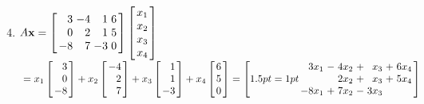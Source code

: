 \begin{multicols}{2}
\begin{ex}
\begin{sol}
\begin{enumerate}[label={\alph*.}]
\setcounter{enumi}{3}
\item
$A\vect{x} = \leftB \begin{array}{rrrr}
3 & -4 & 1 & 6 \\
0 & 2 & 1 & 5 \\
-8 & 7 & -3 & 0
\end{array} \rightB \leftB \begin{array}{r}
x_{1} \\
x_{2} \\
x_{3} \\
x_{4}
\end{array} \rightB$ \\ ${} =
x_{1} \leftB \begin{array}{r}
3 \\
0 \\
-8
\end{array} \rightB + 
x_{2} \leftB \begin{array}{r}
-4 \\
2 \\
7
\end{array} \rightB +
x_{3} \leftB \begin{array}{r}
1 \\
1 \\
-3
\end{array} \rightB +
x_{4} \leftB \begin{array}{r}
6 \\
5 \\
0
\end{array} \rightB = \leftB \arraycolsep=1pt \begin{array}{rrrrrrr}
3x_{1} & - & 4x_{2} & + & x_{3} & + & 6x_{4} \\
 &  & 2x_{2} & + & x_{3} & + & 5x_{4} \\
-8x_{1} & + & 7x_{2} & - & 3x_{3} &  &  \\
\end{array} \rightB
$


\end{enumerate}
\end{sol}
\end{ex}


\end{multicols}
